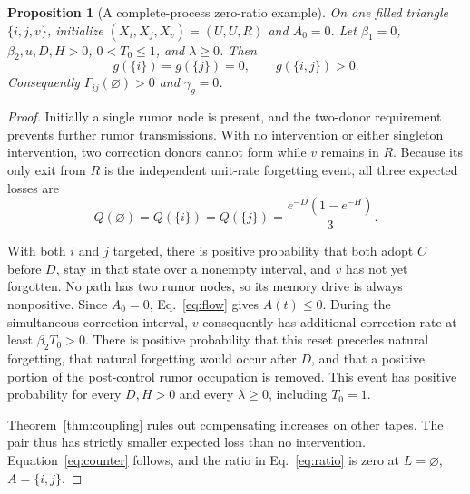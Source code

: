 \documentclass[final,5p,times,twocolumn,sort&compress]{elsarticle}
\theoremstyle{plain}
\newtheorem{proposition}[theorem]{Proposition}
\begin{document}
\begin{proposition}[A complete-process zero-ratio example]
\label{prop:counter}
On one filled triangle $\{i,j,v\}$, initialize $(X_i,X_j,X_v)=(U,U,R)$ and $A_0=0$. Let $\beta_1=0$, $\beta_2,u,D,H>0$, $0<T_0\le1$, and $\lambda\ge0$. Then
\begin{equation}
 g(\{i\})=g(\{j\})=0,\qquad g(\{i,j\})>0.
 \label{eq:counter}
\end{equation}
Consequently $\Gamma_{ij}(\varnothing)>0$ and $\gamma_g=0$.
\end{proposition}
\begin{proof}
Initially a single rumor node is present, and the two-donor requirement prevents further rumor transmissions. With no intervention or either singleton intervention, two correction donors cannot form while $v$ remains in $R$. Because its only exit from $R$ is the independent unit-rate forgetting event, all three expected losses are
\begin{equation}
 Q(\varnothing)=Q(\{i\})=Q(\{j\})
       =\frac{e^{-D}(1-e^{-H})}{3}.\label{eq:singletonloss}
\end{equation}

With both $i$ and $j$ targeted, there is positive probability that both adopt $C$ before $D$, stay in that state over a nonempty interval, and $v$ has not yet forgotten. No path has two rumor nodes, so its memory drive is always nonpositive. Since $A_0=0$, Eq.~\ref{eq:flow} gives $A(t)\le0$. During the simultaneous-correction interval, $v$ consequently has additional correction rate at least $\beta_2T_0>0$. There is positive probability that this reset precedes natural forgetting, that natural forgetting would occur after $D$, and that a positive portion of the post-control rumor occupation is removed. This event has positive probability for every $D,H>0$ and every $\lambda\ge0$, including $T_0=1$.

Theorem~\ref{thm:coupling} rules out compensating increases on other tapes. The pair thus has strictly smaller expected loss than no intervention. Equation~\ref{eq:counter} follows, and the ratio in Eq.~\ref{eq:ratio} is zero at $L=\varnothing$, $A=\{i,j\}$.
\end{proof}
\end{document}
